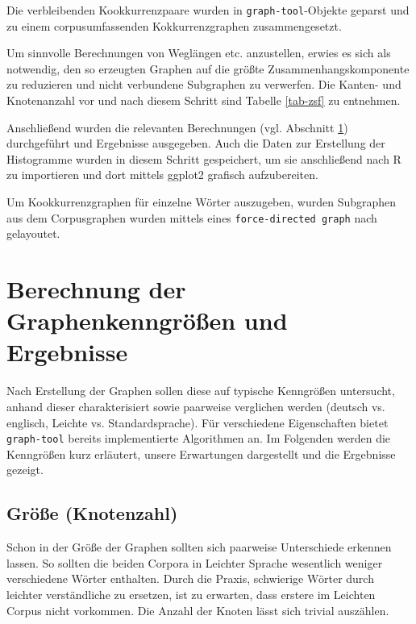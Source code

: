 \documentclass[11pt, a4paper]{article}
\begin{document}
Die verbleibenden Kookkurrenzpaare wurden in \texttt{graph-tool}-Objekte geparst
und zu einem corpusumfassenden Kokkurrenzgraphen zusammengesetzt.

Um sinnvolle Berechnungen von Weglängen etc. anzustellen, erwies es sich als
notwendig, den so erzeugten Graphen auf die größte Zusammenhangskomponente zu
reduzieren und nicht verbundene Subgraphen zu verwerfen.
Die Kanten- und Knotenanzahl vor und nach diesem Schritt sind Tabelle
\ref{tab-zsf} zu entnehmen.

Anschließend wurden die relevanten Berechnungen (vgl. Abschnitt
\ref{berechnung-ergebnisse}) durchgeführt und Ergebnisse ausgegeben.
Auch die Daten zur Erstellung der Histogramme wurden in diesem Schritt
gespeichert, um sie anschließend nach R zu importieren und dort mittels ggplot2
grafisch aufzubereiten.

Um Kookkurrenzgraphen für einzelne Wörter auszugeben, wurden Subgraphen aus dem
Corpusgraphen wurden mittels eines \texttt{force-directed graph} nach
\cite{Hu2006} gelayoutet.


\section{Berechnung der Graphenkenngr\"o\ss{}en und Ergebnisse}
\label{berechnung-ergebnisse}

Nach Erstellung der Graphen sollen diese auf typische Kenngrößen untersucht,
anhand dieser charakterisiert sowie paarweise verglichen werden (deutsch vs.
englisch, Leichte vs. Standardsprache).
Für verschiedene Eigenschaften bietet \texttt{graph-tool} bereits implementierte
Algorithmen an. Im Folgenden werden die Kenngrößen kurz erläutert, unsere
Erwartungen dargestellt und die Ergebnisse gezeigt.


\subsection{Gr\"o\ss{}e (Knotenzahl)}
\label{groesse-knotenzahl}

Schon in der Größe der Graphen sollten sich paarweise Unterschiede erkennen
lassen. So sollten die beiden Corpora in Leichter Sprache wesentlich weniger
verschiedene Wörter enthalten. Durch die Praxis, schwierige Wörter
durch leichter verständliche zu ersetzen, ist zu erwarten, dass erstere im
Leichten Corpus nicht vorkommen. Die Anzahl der Knoten lässt sich trivial
auszählen.
\end{document}
